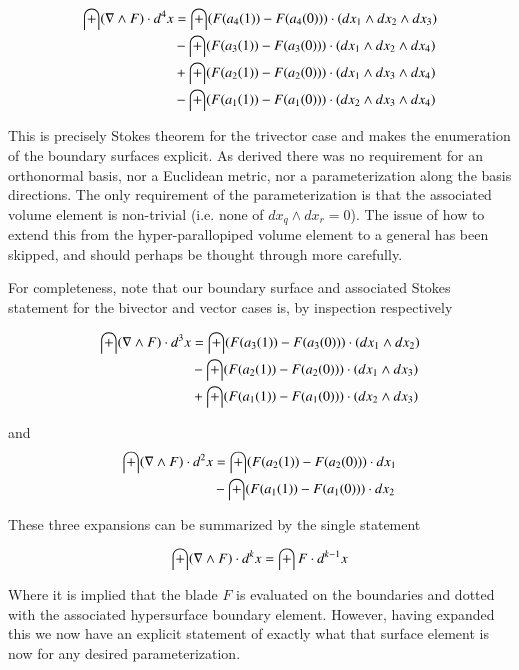 \begin{align*}
\int ( \nabla \wedge F ) \cdot d^4 x 
&= \int (F(a_4(1)) - F(a_4(0))) \cdot ( dx_1 \wedge dx_2 \wedge dx_3 ) \\
&- \int (F(a_3(1)) - F(a_3(0))) \cdot ( dx_1 \wedge dx_2 \wedge dx_4 ) \\
&+ \int (F(a_2(1)) - F(a_2(0))) \cdot ( dx_1 \wedge dx_3 \wedge dx_4 ) \\
&- \int (F(a_1(1)) - F(a_1(0))) \cdot ( dx_2 \wedge dx_3 \wedge dx_4 ) \\
\end{align*}

This is precisely Stokes theorem for the trivector case and makes the enumeration of the boundary surfaces explicit.  As derived there was no requirement for an orthonormal basis, nor a Euclidean metric, nor a parameterization along the basis directions.  The only requirement of the parameterization is that the associated volume element is non-trivial (i.e. none of $dx_q \wedge dx_r = 0$).  The issue of how to extend this from the hyper-parallopiped volume element to a general has been skipped, and should perhaps be thought through more carefully.

For completeness, note that our boundary surface and associated Stokes statement for the bivector and vector cases is, by inspection respectively

\begin{align*}
\int ( \nabla \wedge F ) \cdot d^3 x 
&= \int (F(a_3(1)) - F(a_3(0))) \cdot ( dx_1 \wedge dx_2 ) \\
&- \int (F(a_2(1)) - F(a_2(0))) \cdot ( dx_1 \wedge dx_3 ) \\
&+ \int (F(a_1(1)) - F(a_1(0))) \cdot ( dx_2 \wedge dx_3 ) \\
\end{align*}

and
\begin{align*}
\int ( \nabla \wedge F ) \cdot d^2 x 
&= \int (F(a_2(1)) - F(a_2(0))) \cdot dx_1 \\
&- \int (F(a_1(1)) - F(a_1(0))) \cdot dx_2 \\
\end{align*}

These three expansions can be summarized by the single statement

\begin{align}
\int ( \nabla \wedge F ) \cdot d^k x = \int F \cdot d^{k-1} x 
\end{align}

Where it is implied that the blade $F$ is evaluated on the boundaries and dotted with the associated hypersurface boundary element.  However, having expanded this we now have an explicit statement of exactly what that surface element is now for any desired parameterization.

\EndArticle
